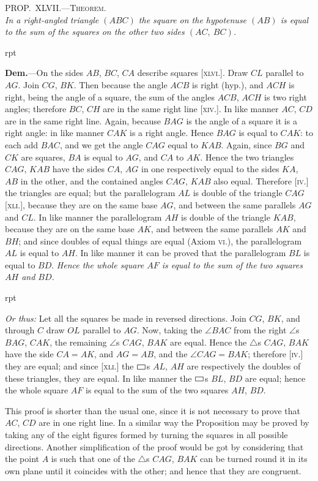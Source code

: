 \documentclass[oneside]{book}
\newcommand\pgram{
	\setlength{\unitlength}{1pt}
	\begin{picture}(11,8)(0,0)
	\linethickness{0.5pt}
	\put(1,0){\line(1,0){9}}
	\put(1,0){\line(0,1){5}}
	\put(1,5){\line(1,0){9}}
	\put(10,0){\line(0,1){5}}
	\end{picture}}
\newcommand\myprop[2]{
\bigskip\Needspace*{4\baselineskip}\begin{center}\textsc{#1}\\\medskip\emph{#2}\par\end{center}
}
\newcommand\imgflow[3]{
\setcounter{wrapwidth}{#1}
\begin{wrapfigure}[#2]{r}{\value{wrapwidth}pt}
\begin{center}
\vspace{-0.3in}
\end{center}
\end{wrapfigure}
}
\begin{document}
\myprop{PROP\@.~XLVII\@.---Theorem.}{In a right-angled triangle $(ABC)$ the square on the
hypotenuse $(AB)$ is equal to the sum of the squares on the other two sides $(AC,\ BC)$.}

\imgflow{175}{15}{f068}

\textbf{Dem.}---On the sides $AB$, $BC$, $CA$ describe squares
[\textsc{xlvi}.]. Draw $CL$ parallel
to $AG$. Join $CG$,
$BK$. Then because the
angle $ACB$ is right
(hyp.), and $ACH$ is
right, being the angle
of a square, the sum of
the angles $ACB$, $ACH$
is two right angles;
therefore $BC$, $CH$ are
in the same right line
[\textsc{xiv}.]. In like manner
$AC$, $CD$ are in the
same right line. Again,
because $BAG$ is the
angle of a square it is a right angle: in like manner
$CAK$ is a right angle. Hence $BAG$ is equal to $CAK$:
to each add $BAC$, and we get the angle $CAG$ equal to
$KAB$. Again, since $BG$ and $CK$ are squares, $BA$ is
equal to $AG$, and $CA$ to $AK$. Hence the two triangles
$CAG$, $KAB$ have the sides $CA$, $AG$ in one respectively
equal to the sides $KA$, $AB$ in the other, and the contained
angles $CAG$, $KAB$ also equal. Therefore [\textsc{iv}.]
the triangles are equal; but the parallelogram $AL$ is
double of the triangle $CAG$ [\textsc{xli}.], because they are on
the same base $AG$, and between the same parallels $AG$
and $CL$. In like manner the parallelogram
$AH$ is double
of the triangle $KAB$, because they are on the same base
$AK$, and between the same parallels $AK$ and $BH$; and
since doubles of equal things are equal (Axiom \textsc{vi}.),
the parallelogram $AL$ is equal to $AH$. In like manner
it can be proved that the parallelogram $BL$ is equal to
$BD$. \emph{Hence the whole square $AF$ is equal to the sum of
the two squares $AH$ and $BD$.}\par\newpage 
\imgflow{115}{15}{f069}

\begin{footnotesize}

\emph{Or thus:} Let all the squares be made in reversed directions.
Join $CG$, $BK$, and through $C$ draw $OL$
parallel to $AG$. Now, taking the $\angle BAC$
from the right $\angle$s $BAG$, $CAK$, the remaining
$\angle$s $CAG$, $BAK$ are equal.
Hence the $\triangle$s $CAG$, $BAK$ have the side
$CA = AK$, and $AG = AB$, and the
$\angle CAG= BAK$; therefore [\textsc{iv}.] they are
equal; and since [\textsc{xli}.] the $\pgram$s $AL$, $AH$
are respectively the doubles of these
triangles, they are equal. In like manner
the $\pgram$s  $BL$, $BD$ are equal; hence
the whole square $AF$ is equal to the
sum of the two squares $AH$, $BD$.

This proof is shorter than the usual
one, since it is not necessary to prove
that $AC$, $CD$ are in one right line. In a similar way the
Proposition may be proved by taking any of the eight figures
formed by turning the squares in all possible directions. Another
simplification of the proof would be got by considering that the
point $A$ is such that one of the $\triangle$s $CAG$, $BAK$ can be turned
round it in its own plane until it coincides with the other; and
hence that they are congruent.
\par\end{footnotesize}
\end{document}

